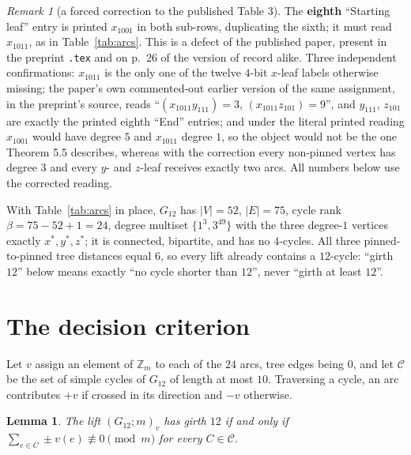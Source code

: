 \documentclass[11pt]{amsart}
\newtheorem{lemma}[theorem]{Lemma}
\theoremstyle{remark}
\newtheorem*{remark}{Remark}
\newcommand{\Zm}{\mathbb{Z}_m}
\newcommand{\Gt}{G_{12}}
\begin{document}
\begin{remark}[a forced correction to the published Table 3]\label{rem:typo}
The \textbf{eighth} ``Starting leaf'' entry is printed $x_{1001}$ in both
sub-rows, duplicating the sixth; it must read $x_{1011}$, as in
Table~\ref{tab:arcs}. This is a defect of the published paper, present in the
preprint \texttt{.tex} and on p.~26 of the version of record alike. Three
independent confirmations: $x_{1011}$ is the only one of the twelve $4$-bit
$x$-leaf labels otherwise missing; the paper's own commented-out earlier
version of the same assignment, in the preprint's source, reads
``$(x_{1011}y_{111}) = 3$, $(x_{1011}z_{101}) = 9$'', and $y_{111}$, $z_{101}$
are exactly the printed eighth ``End'' entries; and under the literal printed
reading $x_{1001}$ would have degree $5$ and $x_{1011}$ degree $1$, so the
object would not be the one Theorem 5.5 describes, whereas with the correction
every non-pinned vertex has degree $3$ and every $y$- and $z$-leaf receives
exactly two arcs. All numbers below use the corrected reading.
\end{remark}

With Table~\ref{tab:arcs} in place, $\Gt$ has $|V| = 52$, $|E| = 75$, cycle rank
$\beta = 75 - 52 + 1 = 24$, degree multiset $\{1^3, 3^{49}\}$ with the three
degree-$1$ vertices exactly $x^*, y^*, z^*$; it is connected, bipartite, and has
no $4$-cycles. All three pinned-to-pinned tree distances equal $6$, so every
lift already contains a $12$-cycle: ``girth $12$'' below means exactly ``no
cycle shorter than $12$'', never ``girth at least $12$''.

\section{The decision criterion}\label{sec:crit}

Let $v$ assign an element of $\Zm$ to each of the $24$ arcs, tree edges being
$0$, and let $\mathcal{C}$ be the set of simple cycles of $\Gt$ of length at
most $10$. Traversing a cycle, an arc contributes $+v$ if crossed in its
direction and $-v$ otherwise.

\begin{lemma}\label{lem:crit}
The lift $(\Gt;m)_v$ has girth $12$ if and only if
$\sum_{e \in C} \pm v(e) \not\equiv 0 \pmod m$ for every $C \in \mathcal{C}$.
\end{lemma}
\end{document}
